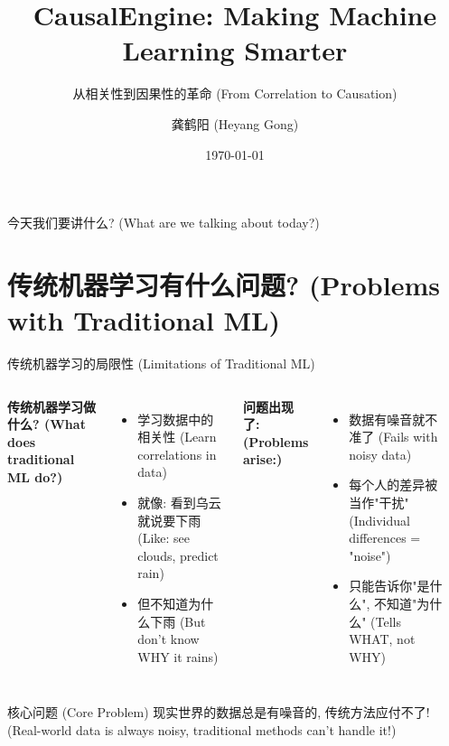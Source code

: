 \documentclass[aspectratio=169,12pt]{beamer}
\title{CausalEngine: Making Machine Learning Smarter}
\subtitle{从相关性到因果性的革命 (From Correlation to Causation)}
\author{龚鹤阳 (Heyang Gong)}
\date{\today}
\begin{document}
\begin{frame}
\titlepage
\end{frame}

\begin{frame}{今天我们要讲什么? (What are we talking about today?)}
\tableofcontents
\end{frame}

\section{传统机器学习有什么问题? (Problems with Traditional ML)}

\begin{frame}{传统机器学习的局限性 (Limitations of Traditional ML)}
\begin{columns}
\textbf{传统机器学习做什么? (What does traditional ML do?)}
\begin{itemize}
    \item 学习数据中的相关性 (Learn correlations in data)
    \item 就像: 看到乌云就说要下雨 (Like: see clouds, predict rain)
    \item 但不知道为什么下雨 (But don't know WHY it rains)
\end{itemize}

\vspace{1em}
\textbf{问题出现了: (Problems arise:)}
\begin{itemize}
    \item 数据有噪音就不准了 (Fails with noisy data)
    \item 每个人的差异被当作"干扰" (Individual differences = "noise")
    \item 只能告诉你"是什么", 不知道"为什么" (Tells WHAT, not WHY)
\end{itemize}

\begin{center}
\end{center}
\end{columns}

\vspace{1em}
\begin{alertblock}{核心问题 (Core Problem)}
现实世界的数据总是有噪音的, 传统方法应付不了! (Real-world data is always noisy, traditional methods can't handle it!)
\end{alertblock}
\end{frame}
\end{document}
